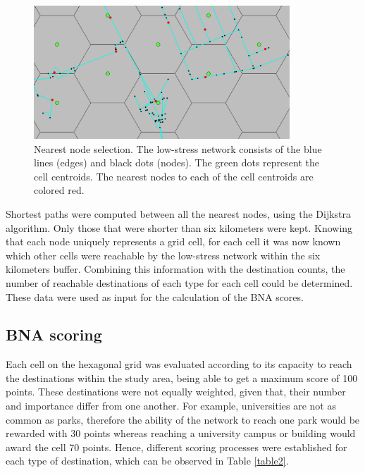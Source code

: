 \documentclass[information,article,submit,moreauthors,pdftex,10pt,a4paper]{mdpi}
\theoremstyle{mdpi}
\newcounter{thm}
\newcounter{ex}
\newcounter{re}
\theoremstyle{mdpidefinition}
\begin{document}
\begin{figure}[ht!]
	\begin{center}
		\captionsetup{justification=centering}
		\includegraphics[height=5cm]{fig2}
		\caption{Nearest node selection. The low-stress network consists of the blue lines (edges) and black dots (nodes). The green dots represent the cell centroids. The nearest nodes to each of the cell centroids are colored red. }
		\label{fig2}
	\end{center}
\end{figure}

Shortest paths were computed between all the nearest nodes, using the Dijkstra algorithm. Only those that were shorter than six kilometers were kept. Knowing that each node uniquely represents a grid cell, for each cell it was now known which other cells were reachable by the low-stress network within the six kilometers buffer. Combining this information with the destination counts, the number of reachable destinations of each type for each cell could be determined. These data were used as input for the calculation of the BNA scores.

\subsection{BNA scoring} \label{score}

Each cell on the hexagonal grid was evaluated according to its capacity to reach the destinations within the study area, being able to get a maximum score of 100 points. These destinations were not equally weighted, given that, their number and importance differ from one another. For example, universities are not as common as parks, therefore the ability of the network to reach one park would be rewarded with 30 points whereas reaching a university campus or building would award the cell 70 points. Hence, different scoring processes were established for each type of destination, which can be observed in Table \ref{table2}.
\end{document}
